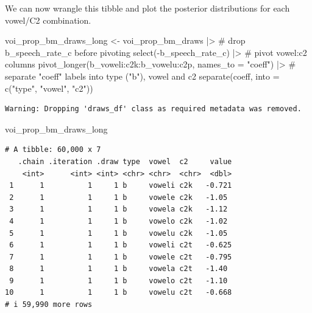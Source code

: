 \documentclass[
  authoryear,
  preprint,
  3p]{elsarticle}
\newenvironment{Shaded}{\begin{snugshade}}{\end{snugshade}}
\newcommand{\AttributeTok}[1]{\textcolor[rgb]{0.40,0.45,0.13}{#1}}
\newcommand{\CommentTok}[1]{\textcolor[rgb]{0.37,0.37,0.37}{#1}}
\newcommand{\FunctionTok}[1]{\textcolor[rgb]{0.28,0.35,0.67}{#1}}
\newcommand{\NormalTok}[1]{\textcolor[rgb]{0.00,0.23,0.31}{#1}}
\newcommand{\OtherTok}[1]{\textcolor[rgb]{0.00,0.23,0.31}{#1}}
\newcommand{\SpecialCharTok}[1]{\textcolor[rgb]{0.37,0.37,0.37}{#1}}
\newcommand{\StringTok}[1]{\textcolor[rgb]{0.13,0.47,0.30}{#1}}
\begin{document}
We can now wrangle this tibble and plot the posterior distributions for
each vowel/C2 combination.

\begin{Shaded}
\begin{Highlighting}[]
\NormalTok{voi\_prop\_bm\_draws\_long }\OtherTok{\textless{}{-}}\NormalTok{ voi\_prop\_bm\_draws }\SpecialCharTok{|\textgreater{}} 
  \CommentTok{\# drop b\_speech\_rate\_c before pivoting}
  \FunctionTok{select}\NormalTok{(}\SpecialCharTok{{-}}\NormalTok{b\_speech\_rate\_c) }\SpecialCharTok{|\textgreater{}} 
  \CommentTok{\# pivot vowel:c2 columns}
  \FunctionTok{pivot\_longer}\NormalTok{(}\StringTok{\textasciigrave{}}\AttributeTok{b\_voweli:c2k}\StringTok{\textasciigrave{}}\SpecialCharTok{:}\StringTok{\textasciigrave{}}\AttributeTok{b\_vowelu:c2p}\StringTok{\textasciigrave{}}\NormalTok{, }\AttributeTok{names\_to =} \StringTok{"coeff"}\NormalTok{) }\SpecialCharTok{|\textgreater{}} 
  \CommentTok{\# separate "coeff" labels into type ("b"), vowel and c2}
  \FunctionTok{separate}\NormalTok{(coeff, }\AttributeTok{into =} \FunctionTok{c}\NormalTok{(}\StringTok{"type"}\NormalTok{, }\StringTok{"vowel"}\NormalTok{, }\StringTok{"c2"}\NormalTok{))}
\end{Highlighting}
\end{Shaded}

\begin{verbatim}
Warning: Dropping 'draws_df' class as required metadata was removed.
\end{verbatim}

\begin{Shaded}
\begin{Highlighting}[]
\NormalTok{voi\_prop\_bm\_draws\_long}
\end{Highlighting}
\end{Shaded}

\begin{verbatim}
# A tibble: 60,000 x 7
   .chain .iteration .draw type  vowel  c2     value
    <int>      <int> <int> <chr> <chr>  <chr>  <dbl>
 1      1          1     1 b     voweli c2k   -0.721
 2      1          1     1 b     vowele c2k   -1.05 
 3      1          1     1 b     vowela c2k   -1.12 
 4      1          1     1 b     vowelo c2k   -1.02 
 5      1          1     1 b     vowelu c2k   -1.05 
 6      1          1     1 b     voweli c2t   -0.625
 7      1          1     1 b     vowele c2t   -0.795
 8      1          1     1 b     vowela c2t   -1.40 
 9      1          1     1 b     vowelo c2t   -1.10 
10      1          1     1 b     vowelu c2t   -0.668
# i 59,990 more rows
\end{verbatim}
\end{document}
